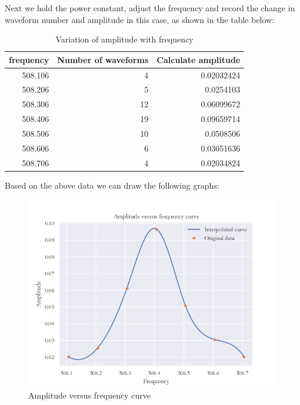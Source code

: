 \documentclass[UTF8]{article}
\begin{document}
    Next we hold the power constant, adjust the frequency and record the change in waveform number and amplitude in this case, as shown in the table below:
    \begin{table}[htbp]
      \centering
      \caption{Variation of amplitude with frequency}
        \begin{tabular}{rrr}
         \toprule[2pt]
        \multicolumn{1}{l}{\textcolor[rgb]{0.165, 0.169, 0.180}{frequency}} & \multicolumn{1}{l}{Number of waveforms} & \multicolumn{1}{l}{Calculate amplitude} \\
        \midrule
        508.106 & 4     & 0.02032424 \\
        508.206 & 5     & 0.0254103 \\
        508.306 & 12    & 0.06099672 \\
        508.406 & 19    & 0.09659714 \\
        508.506 & 10    & 0.0508506 \\
        508.606 & 6     & 0.03051636 \\
        508.706 & 4     & 0.02034824 \\
        \bottomrule[2pt]
        \end{tabular}%
      \label{tab:addlabel}%
    \end{table}%
    
    Based on the above data we can draw the following graphs:
    	\begin{figure}[H]
       	    	\centering
       	    	\includegraphics[clip,scale=1,trim={0 0 0 0}]{fig/fig7.png}
       	        \caption{Amplitude versus frequency curve}
       	        \label{figure.7}
           \end{figure}
           
\end{document}
